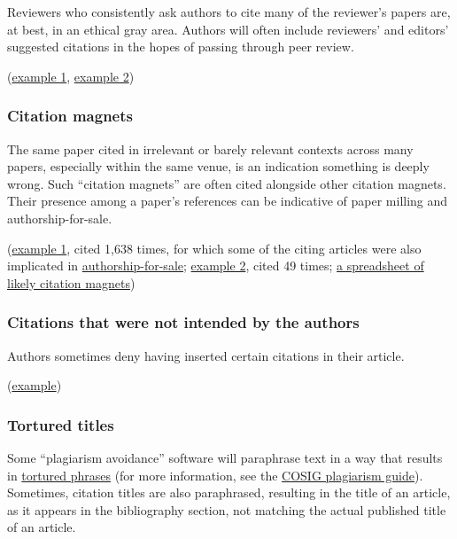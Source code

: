\documentclass[letterpaper, 12pt]{article}
\begin{document}
Reviewers who consistently ask authors to cite many of the reviewer's papers are, at best, in an ethical gray area. Authors will often include reviewers' and editors' suggested citations in the hopes of passing through peer review.

(\href{https://pubpeer.com/publications/90719DBC6E5FF2AC32FDE74F1A6A7F}{example 1}, \href{https://pubpeer.com/publications/1924F147DE045B97261004EB2387AE}{example 2})

\subsubsection*{Citation magnets}

The same paper cited in irrelevant or barely relevant contexts across many papers,
especially within the same venue, is an indication something is deeply wrong.  Such ``citation magnets'' are often cited alongside other citation magnets. Their presence among a paper's references can be indicative of paper milling and authorship-for-sale.

(\href{https://pubpeer.com/search?q=%22A+novel+Aluminum%E2%80%93graphite+dual-Ion+battery%22}{example 1}, cited 1,638 times, for which some of the citing articles were also implicated in \href{https://pubpeer.com/publications/DF9A5CE25CF36DDAFF4B6695B91EA7}{authorship-for-sale}; \href{https://pubpeer.com/publications/B71DD139D3549DCCA37DCEC8AF59D5}{example 2}, cited 49 times;  \href{https://docs.google.com/spreadsheets/d/1o-9OIyzZ9mMqA7bprcbI5nemtYBfxiXH1ndI3y5A43E/edit?usp=sharing}{a spreadsheet of likely citation magnets})

\subsubsection*{Citations that were not intended by the authors}

Authors sometimes deny having inserted certain citations in their article.

(\href{https://pubpeer.com/publications/8DC24BCCDA68EC1954E1FCA74FDB8E\#2}{example})

\subsubsection*{Tortured titles}

Some ``plagiarism avoidance'' software will paraphrase text in a way that results in \href{https://arxiv.org/abs/2107.06751}{tortured phrases} (for more information, see the \href{https://osf.io/ntcb4}{COSIG plagiarism guide}). Sometimes, citation titles are also paraphrased, resulting in the title of an article, as it appears in the bibliography section, not matching the actual published title of an article.
\end{document}
